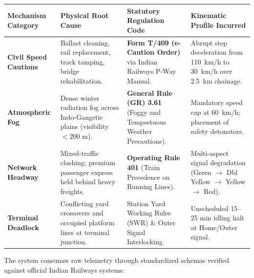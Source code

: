 \documentclass[10pt, a4paper]{article}
\begin{document}
\begin{table}[htbp]
\centering
\small
\renewcommand{\arraystretch}{1.2}
\begin{tabularx}{\textwidth}{p{3.2cm} p{4.6cm} p{4.2cm} X}
\toprule
\rowcolor{irnavy!10}
\textbf{Mechanism Category} & \textbf{Physical Root Cause} & \textbf{Statutory Regulation Code} & \textbf{Kinematic Profile Incurred} \\
\midrule
\textbf{Civil Speed Cautions} & Ballast cleaning, rail replacement, track tamping, bridge rehabilitation. & \textbf{Form T/409 (e-Caution Order)} via Indian Railways P-Way Manual. & Abrupt step deceleration from 110~km/h to 30~km/h over 2.5~km chainage. \\
\textbf{Atmospheric Fog} & Dense winter radiation fog across Indo-Gangetic plains (visibility $< 200\text{ m}$). & \textbf{General Rule (GR) 3.61} (Foggy and Tempestuous Weather Precautions). & Mandatory speed cap at 60~km/h; placement of safety detonators. \\
\textbf{Network Headway} & Mixed-traffic clashing; premium passenger express held behind heavy freights. & \textbf{Operating Rule 401} (Train Precedence on Running Lines). & Multi-aspect signal degradation (Green $\rightarrow$ Dbl Yellow $\rightarrow$ Yellow $\rightarrow$ Red). \\
\textbf{Terminal Deadlock} & Conflicting yard crossovers and occupied platform lines at terminal junction. & Station Yard Working Rules (SWR) \& Outer Signal Interlocking. & Unscheduled 15--25 min idling halt at Home/Outer signal. \\
\bottomrule
\end{tabularx}
\end{table}

\noindent The system consumes raw telemetry through standardized schemas verified against official Indian Railways systems:
\end{document}
